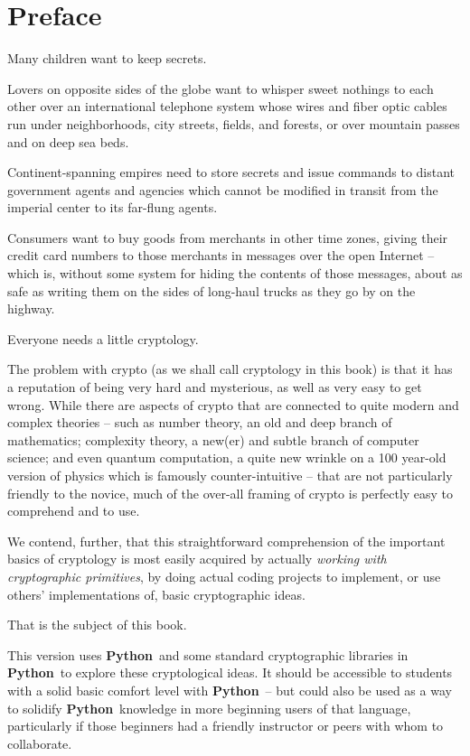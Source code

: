 \documentclass[12pt,letterpaper]{amsbook}
\theoremstyle{definition}
\theoremstyle{remark}
\numberwithin{figure}{section}
\numberwithin{exercise}{chapter}
\numberwithin{section}{chapter}
\numberwithin{equation}{section}
\numberwithin{table}{subsection}
\newenvironment{preface}{}{}
\newcommand{\Python}{{\textbf{\ix{Python}}}}
\newcommand{\ix}[1]{{#1}\index{#1}}
\begin{document}
\begin{preface}
  \chapter*{Preface}\label{preface}

  Many children want to keep secrets.
  
  Lovers on opposite sides of the globe want to whisper sweet nothings to each
  other over an international telephone system whose wires and fiber optic
  cables run under neighborhoods, city streets, fields, and forests, or over
  mountain passes and on deep sea beds.

  Continent-spanning empires need to store secrets and issue commands to distant
  government agents and agencies which cannot be modified in transit from the
  imperial center to its far-flung agents.

  Consumers want to buy goods from merchants in other time zones, giving their
  credit card numbers to those merchants in messages over the open Internet --
  which is, without some system for hiding the contents of those messages,
  about as safe as writing them on the sides of long-haul trucks as they go by
  on the highway.

  Everyone needs a little cryptology.

  The problem with crypto (as we shall call cryptology in this book) is that
  it has a reputation of being very hard and mysterious, as well as very easy
  to get wrong.  While there are aspects of crypto that are connected to quite
  modern and complex theories -- such as number theory, an old and deep
  branch of mathematics; complexity theory, a new(er) and subtle branch of
  computer science; and even quantum computation, a quite new wrinkle on a
  100 year-old version of physics which is famously counter-intuitive -- that
  are not particularly friendly to the novice, much of the over-all framing of
  crypto is perfectly easy to comprehend and to use.

  We contend, further, that this straightforward comprehension of the important
  basics of cryptology is most easily acquired by actually \textit{working with
  cryptographic primitives}, by doing actual coding projects to implement, or
  use others' implementations of, basic cryptographic ideas.

  That is the subject of this book.

  This version uses \Python\ and some standard cryptographic libraries in
  \Python\ to explore these cryptological ideas.  It should be accessible to
  students with a solid basic comfort level with \Python\ -- but could also be
  used as a way to solidify \Python\ knowledge in more beginning users of that
  language, particularly if those beginners had a friendly instructor or peers
  with whom to collaborate.
  
\end{preface}
\end{document}
